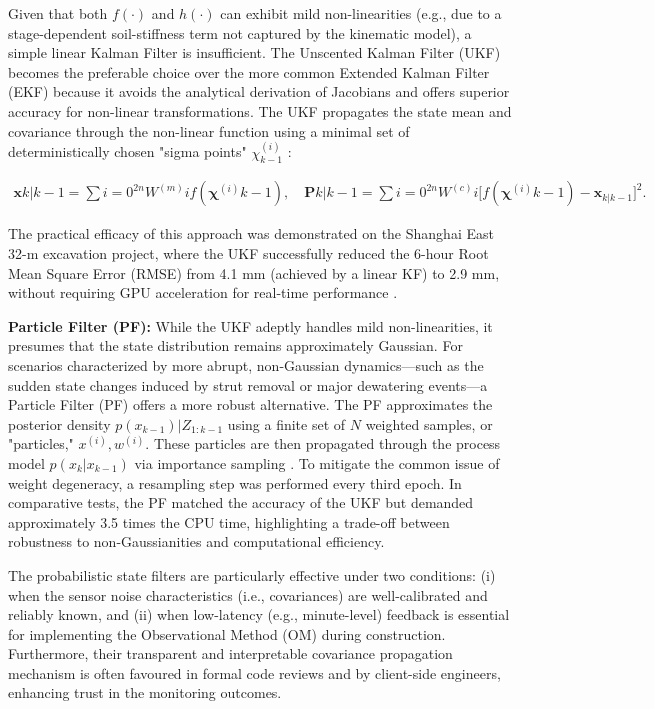 \documentclass[preprint,11pt,authoryear,3p]{elsarticle}
\begin{document}
Given that both $f(\cdot)$ and $h(\cdot)$ can exhibit mild non-linearities (e.g., due to a stage-dependent soil-stiffness term not captured by the kinematic model), a simple linear Kalman Filter is insufficient. The Unscented Kalman Filter (UKF) becomes the preferable choice over the more common Extended Kalman Filter (EKF) because it avoids the analytical derivation of Jacobians and offers superior accuracy for non-linear transformations. The UKF propagates the state mean and covariance through the non-linear function using a minimal set of deterministically chosen "sigma points" $\chi_{k-1}^{(i)}$ \citep{Julier2004UKF}:

\begin{align}
\mathbf{x}{k|k-1}=\sum{i=0}^{2n} W^{(m)}i f(\boldsymbol{\chi}^{(i)}{k-1}),
\quad
\mathbf{P}{k|k-1}=\sum{i=0}^{2n} W^{(c)}i \bigl[f(\boldsymbol{\chi}^{(i)}{k-1}) - \mathbf{x}_{k|k-1}\bigr]^2.
\end{align}

The practical efficacy of this approach was demonstrated on the Shanghai East 32-m excavation project, where the UKF successfully reduced the 6-hour Root Mean Square Error (RMSE) from 4.1 mm (achieved by a linear KF) to 2.9 mm, without requiring GPU acceleration for real-time performance \citep{Li2023}.

\textbf{Particle Filter (PF):} While the UKF adeptly handles mild non-linearities, it presumes that the state distribution remains approximately Gaussian. For scenarios characterized by more abrupt, non-Gaussian dynamics—such as the sudden state changes induced by strut removal or major dewatering events—a Particle Filter (PF) offers a more robust alternative. The PF approximates the posterior density $p(x_{k-1})|Z_{1:k-1}$ using a finite set of $N$ weighted samples, or "particles," $  x^{(i)},w^{(i)}$. These particles are then propagated through the process model $p(x_k|x_{k-1})$ via importance sampling \citep{Arulampalam2002PF}. To mitigate the common issue of weight degeneracy, a resampling step was performed every third epoch. In comparative tests, the PF matched the accuracy of the UKF but demanded approximately 3.5 times the CPU time, highlighting a trade-off between robustness to non-Gaussianities and computational efficiency.

The probabilistic state filters are particularly effective under two conditions: (i) when the sensor noise characteristics (i.e., covariances) are well-calibrated and reliably known, and (ii) when low-latency (e.g., minute-level) feedback is essential for implementing the Observational Method (OM) during construction. Furthermore, their transparent and interpretable covariance propagation mechanism is often favoured in formal code reviews and by client-side engineers, enhancing trust in the monitoring outcomes.
\end{document}
